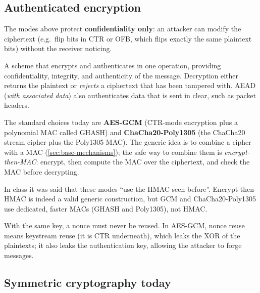 \subsection{Authenticated encryption}
\label{subsec:ae}

The modes above protect \textbf{confidentiality only}: an attacker can modify the ciphertext (e.g.\ flip bits in CTR or OFB, which flips exactly the same plaintext bits) without the receiver noticing.

\begin{definition}
A scheme that encrypts and authenticates in one operation, providing confidentiality, integrity, and authenticity of the message. Decryption either returns the plaintext or \emph{rejects} a ciphertext that has been tampered with. AEAD (\emph{with associated data}) also authenticates data that is sent in clear, such as packet headers.
\end{definition}

The standard choices today are \textbf{AES-GCM} (CTR-mode encryption plus a polynomial MAC called GHASH) and \textbf{ChaCha20-Poly1305} (the ChaCha20 stream cipher plus the Poly1305 MAC). The generic idea is to combine a cipher with a MAC (\cref{sec:base-mechanisms}); the safe way to combine them is \emph{encrypt-then-MAC}: encrypt, then compute the MAC over the ciphertext, and check the MAC before decrypting.

\begin{remark}
In class it was said that these modes \enquote{use the HMAC seen before}. Encrypt-then-HMAC is indeed a valid generic construction, but GCM and ChaCha20-Poly1305 use dedicated, faster MACs (GHASH and Poly1305), not HMAC.
\end{remark}

\begin{remark}
With the same key, a nonce must never be reused. In AES-GCM, nonce reuse means keystream reuse (it is CTR underneath), which leaks the XOR of the plaintexts; it also leaks the authentication key, allowing the attacker to forge messages.
\end{remark}

\subsection{Symmetric cryptography today}

